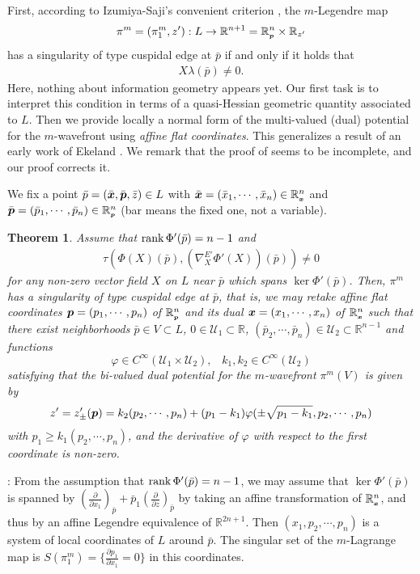 \documentclass[10pt]{amsart}
\def\proof{\noindent {\sl Proof} :\;  }
\newcommand{\U}{\mathcal{U}}
\newcommand{\R}{\mathbb{R}}
\newcommand\rank{\mbox{\rm rank}\,}
\def\proof{\noindent {\sl Proof} :\;  }
\def\rd{\partial}
\def\bx{\mbox{\boldmath $x$}}
\def\bp{\mbox{\boldmath $p$}}
\def\bbx{\mbox{\tiny$\bx$}}
\def\bbp{\mbox{\tiny$\bp$}}
\newtheorem{thm}{\bf Theorem}[section]
\newcommand{\vp}{\varphi}
\begin{document}
First, according to Izumiya-Saji's convenient criterion \cite{IS}, 
the $m$-Legendre map 
$$\pi^m=(\pi^m_1, z'): L \to \R^{n+1}=\R^n_{\bbp}\times \R_{z'}$$ 
has a singularity of type cuspidal edge at $\bar{p}$ if and only if it holds that
\begin{align*}
X\lambda(\bar{p}) \neq 0.
\end{align*}
Here, nothing about information geometry appears yet. 
Our first task is to interpret this condition in terms of a quasi-Hessian geometric quantity associated to $L$. 
Then we provide locally a normal form of the multi-valued (dual) potential for the $m$-wavefront using {\em affine flat coordinates}. 
This generalizes a result of an early work of Ekeland \cite[Proposition 2.7]{Ekeland}. 
We remark that the proof of \cite{Ekeland} seems to be incomplete, 
and our proof corrects it.

We fix a point $\bar{p}=(\bar{\bx}, \bar{\bp}, \bar{z}) \in L$ with 
$\bar{\bx}=(\bar{x}_1, \cdots, \bar{x}_n) \in \R_{\bbx}^n$ and  
$\bar{\bp}=(\bar{p}_1, \cdots, \bar{p}_n) \in \R_{\bbp}^n$ (bar means the fixed one, not a variable). 

\begin{thm}\label{m-wavefront1} 
Assume that $\rank \Phi'(\bar{p}) = n-1$ and 
\begin{align}\label{m-condition1}
\tau(\Phi(X)(\bar{p}), (\nabla^{E'}_{X}\Phi'(X))(\bar{p}))\neq 0
\end{align}
for any non-zero vector field $X$ on $L$ near $\bar{p}$ which spans $\ker \Phi'({\bar{p}})$.
Then, $\pi^m$ has a singularity of type cuspidal edge at $\bar{p}$, that is, 
we may retake affine flat coordinates 
$\bp=(p_1,\cdots,p_n)$ of $\R^n_{\bbp}$ and its dual $\bx=(x_1, \cdots, x_n)$ of $\R^n_{\bbx}$ 
such that there exist neighborhoods  
$\bar{p} \in V\subset L$,
$0 \in \U_1\subset\R$,
$(\bar{p}_2, \cdots, \bar{p}_{n})  \in \U_2\subset\R^{n-1}$ 
and functions 
$$\vp\in C^\infty(\U_1\times\U_2),\; \;\; k_1,k_2\in C^\infty(\U_2)$$ 
satisfying that  
the bi-valued dual potential for the $m$-wavefront $\pi^m(V)$ is given by 
\begin{align}\label{normal_1}
z'=z'_\pm(\bp)=k_2(p_2,\cdots,p_{n})+(p_1-k_1)\vp(\pm\sqrt{p_1-k_1}, p_2,\cdots,p_{n})
\end{align}
with $p_1\geq k_1(p_2,\cdots,p_{n})$,  
and 
the derivative of $\vp$ with respect to the first coordinate is non-zero.
\end{thm}



\proof 
From the assumption that $\rank \Phi'(\bar{p}) = n-1$, we may assume that $\ker \Phi'(\bar{p})$ is spanned by 
$(\frac{\rd}{\rd x_1})_{\bar{p}} + \bar{p}_1(\frac{\rd}{\rd z})_{\bar{p}}$
by taking an affine transformation of $\R^n_{\bbx}$, 
and thus by an affine Legendre equivalence of $\R^{2n+1}$. 
Then $(x_1, p_2,\cdots,p_{n})$ is a system of local coordinates of $L$ around $\bar{p}$. 
The singular set of the $m$-Lagrange map is $S(\pi^m_1) = \{\frac{\rd p_1}{\rd x_1}=0\}$ in this coordinates.
\end{document}
